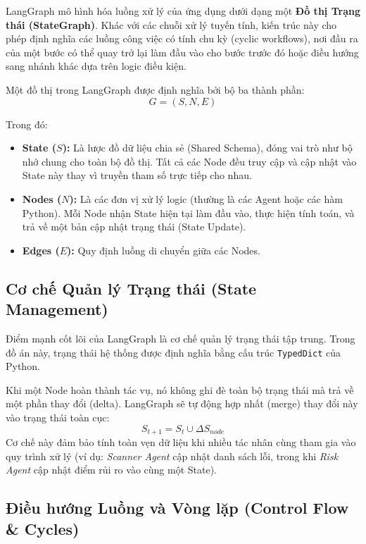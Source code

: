 LangGraph mô hình hóa luồng xử lý của ứng dụng dưới dạng một \textbf{Đồ thị Trạng thái (StateGraph)}. Khác với các chuỗi xử lý tuyến tính, kiến trúc này cho phép định nghĩa các luồng công việc có tính chu kỳ (cyclic workflows), nơi đầu ra của một bước có thể quay trở lại làm đầu vào cho bước trước đó hoặc điều hướng sang nhánh khác dựa trên logic điều kiện.

Một đồ thị trong LangGraph được định nghĩa bởi bộ ba thành phần:
\begin{equation}
    G = (S, N, E)
\end{equation}

Trong đó:
\begin{itemize}
    \item \textbf{State ($S$):} Là lược đồ dữ liệu chia sẻ (Shared Schema), đóng vai trò như bộ nhớ chung cho toàn bộ đồ thị. Tất cả các Node đều truy cập và cập nhật vào State này thay vì truyền tham số trực tiếp cho nhau.
    \item \textbf{Nodes ($N$):} Là các đơn vị xử lý logic (thường là các Agent hoặc các hàm Python). Mỗi Node nhận State hiện tại làm đầu vào, thực hiện tính toán, và trả về một bản cập nhật trạng thái (State Update).
    \item \textbf{Edges ($E$):} Quy định luồng di chuyển giữa các Nodes.
\end{itemize}

\subsection{Cơ chế Quản lý Trạng thái (State Management)}

Điểm mạnh cốt lõi của LangGraph là cơ chế quản lý trạng thái tập trung. Trong đồ án này, trạng thái hệ thống được định nghĩa bằng cấu trúc \texttt{TypedDict} của Python.

Khi một Node hoàn thành tác vụ, nó không ghi đè toàn bộ trạng thái mà trả về một phần thay đổi (delta). LangGraph sẽ tự động hợp nhất (merge) thay đổi này vào trạng thái toàn cục:
\begin{equation}
    S_{t+1} = S_t \cup \Delta S_{node}
\end{equation}
Cơ chế này đảm bảo tính toàn vẹn dữ liệu khi nhiều tác nhân cùng tham gia vào quy trình xử lý (ví dụ: \textit{Scanner Agent} cập nhật danh sách lỗi, trong khi \textit{Risk Agent} cập nhật điểm rủi ro vào cùng một State).

\subsection{Điều hướng Luồng và Vòng lặp (Control Flow \& Cycles)}


